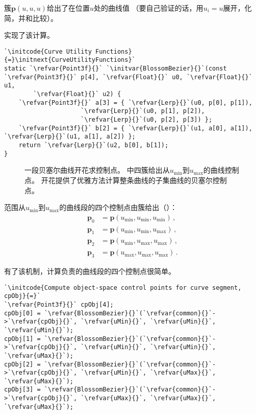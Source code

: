 簇$\bm p(u,u,u)$给出了在位置$u$处的曲线值
（要自己验证的话，用$u_i=u$展开，化简，并和比较）。

实现了该计算。
\begin{lstlisting}
`\initcode{Curve Utility Functions}{=}\initnext{CurveUtilityFunctions}`
static `\refvar{Point3f}{}` `\initvar{BlossomBezier}{}`(const `\refvar{Point3f}{}` p[4], `\refvar{Float}{}` u0, `\refvar{Float}{}` u1,
        `\refvar{Float}{}` u2) {
    `\refvar{Point3f}{}` a[3] = { `\refvar{Lerp}{}`(u0, p[0], p[1]),
                     `\refvar{Lerp}{}`(u0, p[1], p[2]),
                     `\refvar{Lerp}{}`(u0, p[2], p[3]) };
    `\refvar{Point3f}{}` b[2] = { `\refvar{Lerp}{}`(u1, a[0], a[1]), `\refvar{Lerp}{}`(u1, a[1], a[2]) };
    return `\refvar{Lerp}{}`(u2, b[0], b[1]);
}
\end{lstlisting}
\begin{figure}[htbp]
    \centering
    \caption{一段贝塞尔曲线开花求控制点。
        \protect{}中四簇给出从$u_{\min}$到$u_{\max}$的曲线控制点。
        开花提供了优雅方法计算整条曲线的子集曲线的贝塞尔控制点。}
    \label{fig:3.19}
\end{figure}

范围从$u_{\min}$到$u_{\max}$的曲线段的四个控制点由簇给出（）：
\begin{align}\label{eq:3.5}
    \bm p_0 & =\bm p(u_{\min},u_{\min},u_{\min})\nonumber\, , \\
    \bm p_1 & =\bm p(u_{\min},u_{\min},u_{\max})\nonumber\, , \\
    \bm p_2 & =\bm p(u_{\min},u_{\max},u_{\max})\nonumber\, , \\
    \bm p_3 & =\bm p(u_{\max},u_{\max},u_{\max})\, .
\end{align}

有了该机制，计算负责的曲线段的四个控制点很简单。
\begin{lstlisting}
`\initcode{Compute object-space control points for curve segment, cpObj}{=}`
`\refvar{Point3f}{}` cpObj[4];
cpObj[0] = `\refvar{BlossomBezier}{}`(`\refvar{common}{}`->`\refvar{cpObj}{}`, `\refvar{uMin}{}`, `\refvar{uMin}{}`, `\refvar{uMin}{}`);
cpObj[1] = `\refvar{BlossomBezier}{}`(`\refvar{common}{}`->`\refvar{cpObj}{}`, `\refvar{uMin}{}`, `\refvar{uMin}{}`, `\refvar{uMax}{}`);
cpObj[2] = `\refvar{BlossomBezier}{}`(`\refvar{common}{}`->`\refvar{cpObj}{}`, `\refvar{uMin}{}`, `\refvar{uMax}{}`, `\refvar{uMax}{}`);
cpObj[3] = `\refvar{BlossomBezier}{}`(`\refvar{common}{}`->`\refvar{cpObj}{}`, `\refvar{uMax}{}`, `\refvar{uMax}{}`, `\refvar{uMax}{}`);
\end{lstlisting}

